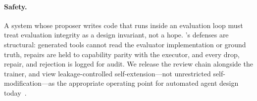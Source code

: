 \paragraph{Safety.}  A system whose proposer writes code that runs inside
an evaluation loop must treat evaluation integrity as a design invariant,
not a hope.  \method{}'s defenses are structural: generated tools cannot read the
evaluator implementation or ground truth, repairs are held to capability parity
with the executor, and every drop, repair, and rejection is logged for
audit.  We release the review chain alongside the trainer, and view
leakage-controlled self-extension---not unrestricted self-modification---as
the appropriate operating point for automated agent design
today~\citep{dgm,skalse2022}.
